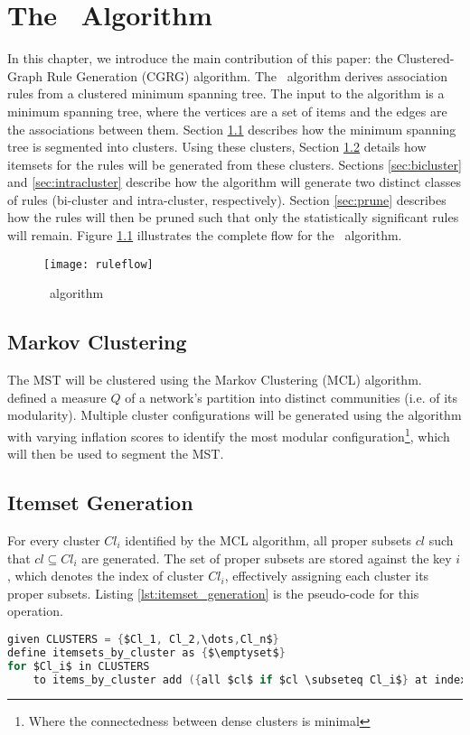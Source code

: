 
\chapter{The \algo\ Algorithm}
In this chapter, we introduce the main contribution of this paper: the Clustered-Graph Rule Generation (CGRG) algorithm. The \algo\ algorithm derives association rules from a clustered minimum spanning tree. The input to the algorithm is a minimum spanning tree, where the vertices are a set of items and the edges are the associations between them. Section \ref{sec:clustering} describes how the minimum spanning tree is segmented into clusters. Using these clusters, Section \ref{sec:itemsets} details how itemsets for the rules will be generated from these clusters. Sections \ref{sec:bicluster} and \ref{sec:intracluster} describe how the algorithm will generate two distinct classes of rules (bi-cluster and intra-cluster, respectively). Section \ref{sec:prune} describes how the rules will then be pruned such that only the statistically significant rules will remain.
Figure \ref{fig:algorithm_flow} illustrates the complete flow for the \algo\ algorithm.
\begin{figure}[H]
\centering
\texttt{[image: ruleflow]}
\caption{\algo\ algorithm}
\label{fig:algorithm_flow}
\end{figure}


\section{Markov Clustering}
\label{sec:clustering}
The MST will be clustered using the Markov Clustering (MCL) algorithm.
 defined a measure $Q$ of a network's partition into distinct communities (i.e. of its modularity).
Multiple cluster configurations will be generated using the algorithm with varying inflation scores to identify the most modular configuration\footnote{Where the connectedness between dense clusters is minimal}, which will then be used to segment the MST.


\section{Itemset Generation}
\label{sec:itemsets}
For every cluster $Cl_i$ identified by the MCL algorithm, all proper subsets $cl$ such that $cl \subseteq Cl_i$ are generated. The set of proper subsets are stored against the key $i$, which denotes the index of cluster $Cl_i$, effectively assigning each cluster its proper subsets. Listing \ref{lst:itemset_generation} is the pseudo-code for this operation.
\begin{lstlisting}[language=C, mathescape=true, caption=Cluster Itemset Generation, label=lst:itemset_generation]
given CLUSTERS = {$Cl_1, Cl_2,\dots,Cl_n$}
define itemsets_by_cluster as {$\emptyset$}
for $Cl_i$ in CLUSTERS
    to items_by_cluster add ({all $cl$ if $cl \subseteq Cl_i$} at index $i$)
\end{lstlisting}

